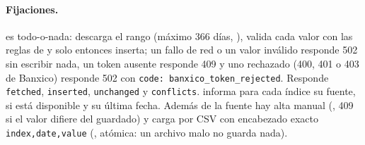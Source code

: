 \begin{sloppypar}
\paragraph{Fijaciones.}  es todo-o-nada: descarga el rango
(máximo 366 días, ), valida cada valor con las reglas de
 y solo entonces inserta; un fallo de red o un valor inválido responde
502 sin escribir nada, un token ausente responde 409 y uno rechazado (400, 401 o 403 de Banxico) responde 502 con
\texttt{code: banxico\_token\_rejected}. Responde \texttt{fetched}, \texttt{inserted}, \texttt{unchanged} y
\texttt{conflicts}.  informa para cada índice su fuente, si está
disponible y su última fecha. Además de la fuente hay alta manual (, 409
si el valor difiere del guardado) y carga por CSV con encabezado exacto \texttt{index,date,value}
(, atómica: un archivo malo no guarda nada).


\end{sloppypar}
